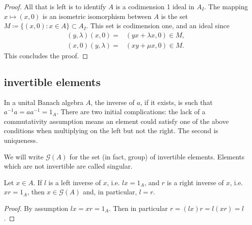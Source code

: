 \documentclass[12pt]{article}
\begin{document}
\begin{proof}
	All that is left is to identify $A$ is a codimension 1 ideal in $A_I$. The mapping $x\mapsto (x,0)$ is an isometric isomorphism between $A$ is the set $M\coloneqq \{(x,0) : x\in A\}\subset A_I$. This set is codimension one, and an ideal since 
	\begin{align*}
		(y,\lambda)(x,0) =& (yx + \lambda x, 0) \in M, \\
		(x,0)(y,\lambda) =& (xy + \mu x, 0) \in M.
	\end{align*}
	This concludes the proof.
\end{proof}


\subsection{invertible elements} %

In a unital Banach algebra $A$, the inverse of $a$, if it exists, is such that $a^{-1}a=aa^{-1}=1_A$. There are two initial complications: the lack of a commutativity assumption means an element could satisfy one of the above conditions when multiplying on the left but not the right. The second is uniqueness.

We will write $\mathcal{G}(A)$ for the set (in fact, group) of invertible elements. Elements which are not invertible are called singular.

\begin{proposition}
\label{prop_left_and_right_inverses}
	Let $x\in A$. If $l$ is a left inverse of $x$, i.e. $lx = 1_A$, and $r$ is a right inverse of $x$, i.e. $xr = 1_A$, then $x\in \mathcal{G}(A)$ and, in particular, $l=r$.
\end{proposition}
\begin{proof}
	By assumption $lx=xr=1_A$. Then in particular $r=(lx)r=l(xr)=l$.
\end{proof}
\end{document}
